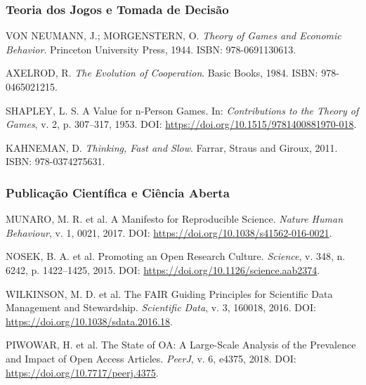 \subsubsection{Teoria dos Jogos e Tomada de Decisão}

\begin{enumerate}[leftmargin=*, label={[R\arabic*]}, resume]
  \item VON NEUMANN, J.; MORGENSTERN, O. \textit{Theory of Games and Economic Behavior}. Princeton University Press, 1944. ISBN: 978-0691130613.
  
  \item AXELROD, R. \textit{The Evolution of Cooperation}. Basic Books, 1984. ISBN: 978-0465021215.
  
  \item SHAPLEY, L. S. A Value for n-Person Games. In: \textit{Contributions to the Theory of Games}, v. 2, p. 307--317, 1953. DOI: \url{https://doi.org/10.1515/9781400881970-018}.
  
  \item KAHNEMAN, D. \textit{Thinking, Fast and Slow}. Farrar, Straus and Giroux, 2011. ISBN: 978-0374275631.
\end{enumerate}

\subsubsection{Publicação Científica e Ciência Aberta}

\begin{enumerate}[leftmargin=*, label={[R\arabic*]}, resume]
  \item MUNARO, M. R. et al. A Manifesto for Reproducible Science. \textit{Nature Human Behaviour}, v. 1, 0021, 2017. DOI: \url{https://doi.org/10.1038/s41562-016-0021}.
  
  \item NOSEK, B. A. et al. Promoting an Open Research Culture. \textit{Science}, v. 348, n. 6242, p. 1422--1425, 2015. DOI: \url{https://doi.org/10.1126/science.aab2374}.
  
  \item WILKINSON, M. D. et al. The FAIR Guiding Principles for Scientific Data Management and Stewardship. \textit{Scientific Data}, v. 3, 160018, 2016. DOI: \url{https://doi.org/10.1038/sdata.2016.18}.
  
  \item PIWOWAR, H. et al. The State of OA: A Large-Scale Analysis of the Prevalence and Impact of Open Access Articles. \textit{PeerJ}, v. 6, e4375, 2018. DOI: \url{https://doi.org/10.7717/peerj.4375}.
\end{enumerate}

